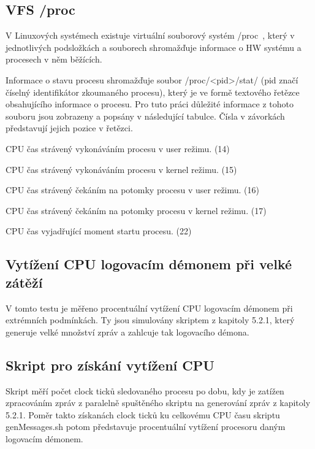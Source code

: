 \documentclass[thesis=B,czech]{FITthesis}[2012/06/26]
\begin{document}
\subsection{VFS /proc}
V Linuxových systémech existuje virtuální souborový systém /proc~\cite{procFilesystem}, který v jednotlivých podsložkách a souborech shromažďuje informace o HW systému a procesech v něm běžících.

Informace o stavu procesu shromažďuje soubor /proc/<pid>/stat/ (pid značí číselný identifikátor zkoumaného procesu), který je ve formě textového řetězce obsahujícího informace o procesu. Pro tuto práci důležité informace z tohoto souboru jsou zobrazeny a popsány v následující tabulce. Čísla v závorkách představují jejich pozice v řetězci.

\begin{description}
\setlength\itemsep{-1ex}
	\item [utime:] CPU čas strávený vykonáváním procesu v user režimu. (14)
	\item [stime:] CPU čas strávený vykonáváním procesu v kernel režimu. (15)
	\item [cutime:] CPU čas strávený čekáním na potomky procesu v user režimu. (16)
	\item [cstime:] CPU čas strávený čekáním na potomky procesu v kernel režimu. (17)
	\item [starttime:] CPU čas vyjadřující moment startu procesu. (22)
\end{description}

\subsection{Vytížení CPU logovacím démonem při velké zátěží}
V tomto testu je měřeno procentuální vytížení CPU logovacím démonem při extrémních podmínkách. Ty jsou simulovány skriptem z kapitoly 5.2.1, který generuje velké množství zpráv a zahlcuje tak logovacího démona. 

\subsection*{Skript pro získání vytížení CPU}
Skript měří počet clock ticků sledovaného procesu po dobu, kdy je zatížen zpracováním zpráv z paralelně spuštěného skriptu na generování zpráv z kapitoly 5.2.1. Poměr takto získanách clock ticků ku celkovému CPU času skriptu genMessages.sh potom představuje procentuální vytížení procesoru daným logovacím démonem.
\end{document}
